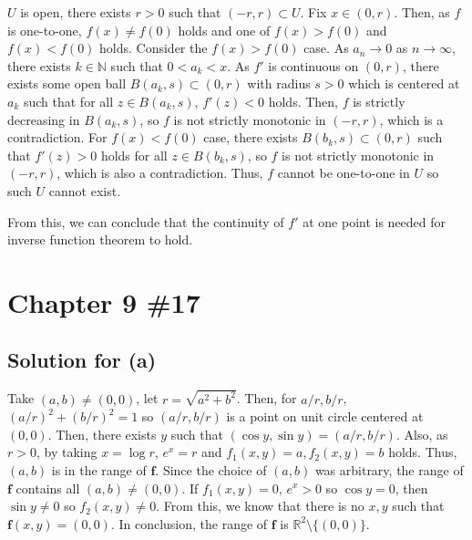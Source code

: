 \documentclass{scrartcl}
\begin{document}
\(U\) is open, there exists \(r > 0\) such that \((-r, r) \subset U\). Fix \(x
\in (0, r)\). Then, as \(f\) is one-to-one, \(f(x) \not = f(0)\) holds and one
of \(f(x) > f(0)\) and \(f(x) < f(0)\) holds. Consider the \(f(x) > f(0)\)
case. As \(a_n \to 0\) as \(n \to \infty\), there exists \(k \in \mathbb{N}\)
such that \(0 < a_k < x\). As \(f'\) is continuous on \((0, r)\), there exists
some open ball \(B(a_k, s) \subset (0, r)\) with radius \(s > 0\) which is
centered at \(a_k\) such that for all \(z \in B(a_k, s)\), \(f'(z) < 0\) holds.
Then, \(f\) is strictly decreasing in \(B(a_k, s)\), so \(f\) is not strictly
monotonic in \((-r, r)\), which is a contradiction. For \(f(x) < f(0)\) case,
there exists \(B(b_k, s) \subset (0, r)\) such that \(f'(z) > 0\) holds for all
\(z \in B(b_k, s)\), so \(f\) is not strictly monotonic in \((-r, r)\), which
is also a contradiction. Thus, \(f\) cannot be one-to-one in \(U\) so such
\(U\) cannot exist.

From this, we can conclude that the continuity of \(f'\) at one point is needed
for inverse function theorem to hold.

\section{Chapter 9 \#17}
\subsection{Solution for (a)}
Take \((a, b) \not = (0, 0)\), let \(r = \sqrt{a^2 + b^2}\). Then, for \(a / r,
b / r\), \((a / r)^2 + (b / r)^2 = 1\) so \((a / r, b / r)\) is a point on unit
circle centered at \((0, 0)\). Then, there exists \(y\) such that \((\cos y,
\sin y) = (a / r, b / r)\). Also, as \(r > 0\), by taking \(x = \log r\),
\(e^x = r\) and \(f_1(x, y) = a, f_2(x, y) = b\) holds. Thus, \((a, b)\) is in
the range of \(\mathbf{f}\). Since the choice of \((a, b)\) was arbitrary, the
range of \(\mathbf{f}\) contains all \((a, b) \not = (0, 0)\). If \(f_1(x, y) =
0\), \(e^x > 0\) so \(\cos y = 0\), then \(\sin y \not = 0\) so \(f_2(x, y)
\not = 0\). From this, we know that there is no \(x, y\) such that
\(\mathbf{f}(x, y) = (0, 0)\). In conclusion, the range of \(\mathbf{f}\) is
\(\mathbb{R}^2 \setminus \{(0, 0)\}\).
\end{document}
